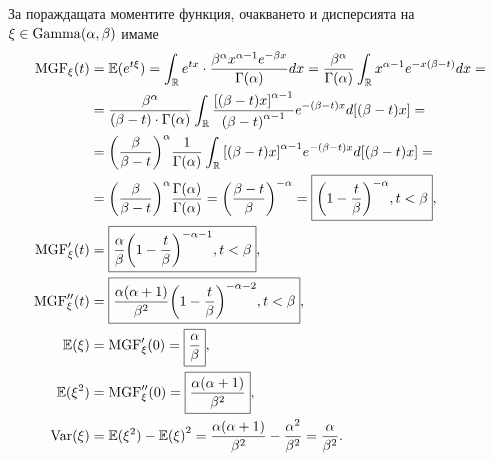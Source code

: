 \documentclass[numbers=endperiod, DIV=15, bibliography=totocnumbered]{scrartcl}
\begin{document}
За пораждащата моментите функция, очакването и дисперсията на $\xi \in \operatorname{Gamma}(\alpha, \beta)$ имаме
\begingroup
\allowdisplaybreaks
\begin{align*}
  \operatorname{MGF}_\xi(t)
  &=
  \mathbb{E}(e^{t\xi})
  =
  \int_{\mathbb{R}} e^{tx} \cdot \frac {\beta^\alpha x^{\alpha-1} e^{-\beta x}} {\Gamma(\alpha)} dx
  =
  \frac {\beta^\alpha} {\Gamma(\alpha)} \int_{\mathbb{R}} x^{\alpha-1} e^{-x(\beta-t)} dx
  = \\ &=
  \frac {\beta^\alpha} {(\beta-t) \cdot \Gamma(\alpha)} \int_{\mathbb{R}} \frac {{[(\beta-t)x]}^{\alpha-1}} {{(\beta-t)}^{\alpha-1}} e^{-(\beta-t)x} d[(\beta-t)x]
  = \\ &=
  {\left(\frac \beta {\beta-t} \right)}^\alpha \frac 1 {\Gamma(\alpha)} \int_{\mathbb{R}} {[(\beta-t)x]}^{\alpha-1} e^{-(\beta-t)x} d[(\beta-t)x]
  = \\ &=
  {\left(\frac \beta {\beta-t} \right)}^\alpha \frac {\Gamma(\alpha)} {\Gamma(\alpha)}
  =
  {\left(\frac {\beta-t} \beta \right)}^{-\alpha}
  =
  \boxed{{\left(1 - \frac t \beta \right)}^{-\alpha}, t < \beta},
  \\
  \operatorname{MGF}'_\xi(t)
  &=
  \boxed{\frac \alpha \beta {\left(1 - \frac t \beta \right)}^{-\alpha-1}, t < \beta},
  \\
  \operatorname{MGF}''_\xi(t)
  &=
  \boxed{\frac {\alpha(\alpha+1)} {\beta^2} {\left(1 - \frac t \beta \right)}^{-\alpha-2}, t < \beta},
  \\
  \mathbb{E}(\xi)
  &=
  \operatorname{MGF}'_\xi(0)
  =
  \boxed{\frac \alpha \beta},
  \\
  \mathbb{E}(\xi^2)
  &=
  \operatorname{MGF}''_\xi(0)
  =
  \boxed{\frac {\alpha(\alpha+1)} {\beta^2}},
  \\
  \operatorname{Var}(\xi)
  &=
  \mathbb{E}(\xi^2) - {\mathbb{E}(\xi)}^2
  =
  \frac {\alpha(\alpha+1)} {\beta^2} - \frac {\alpha^2} {\beta^2}
  =
  \frac \alpha {\beta^2}.
\end{align*}
\endgroup
\end{document}
